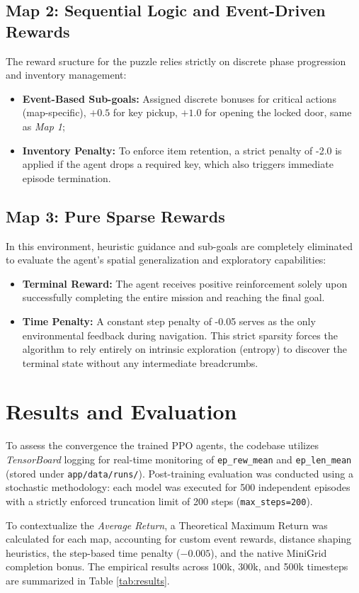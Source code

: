 \documentclass[12pt,a4paper]{article}
\begin{document}
\subsection{Map 2: Sequential Logic and Event-Driven Rewards}The reward sructure for the puzzle relies strictly on discrete phase progression and inventory management:
\begin{itemize}
    \item \textbf{Event-Based Sub-goals:}  Assigned discrete bonuses for critical actions (map-specific), $+0.5$ for key pickup, $+1.0$ for opening the locked door, same as \textit{Map 1};
    \item \textbf{Inventory Penalty:} To enforce item retention, a strict penalty of -2.0 is applied if the agent drops a required key, which also triggers immediate episode termination.
\end{itemize}

\subsection{Map 3: Pure Sparse Rewards}
In this environment, heuristic guidance and sub-goals are completely eliminated to evaluate the agent's spatial generalization and exploratory capabilities:
\begin{itemize}
    \item \textbf{Terminal Reward:} The agent receives positive reinforcement solely upon successfully completing the entire mission and reaching the final goal.
    \item \textbf{Time Penalty:} A constant step penalty of -0.05 serves as the only environmental feedback during navigation. This strict sparsity forces the algorithm to rely entirely on intrinsic exploration (entropy) to discover the terminal state without any intermediate breadcrumbs.
\end{itemize}
\section{Results and Evaluation}
To assess the convergence the trained PPO agents, the codebase utilizes \textit{TensorBoard} logging for real-time monitoring of \texttt{ep\_rew\_mean} and \texttt{ep\_len\_mean} (stored under \texttt{app/data/runs/}). Post-training evaluation was conducted using a stochastic methodology: each model was executed for 500 independent episodes with a strictly enforced truncation limit of 200 steps (\texttt{max\_steps=200}).

To contextualize the \textit{Average Return},
a Theoretical Maximum Return was calculated for each map,
accounting for custom event rewards, distance shaping heuristics,
the step-based time penalty ($-0.005$), and the native MiniGrid completion bonus.
The empirical results across 100k, 300k, and 500k timesteps are summarized in Table \ref{tab:results}.
\end{document}
